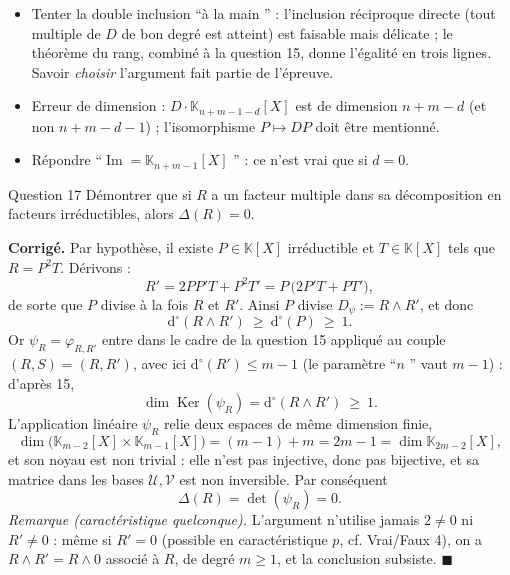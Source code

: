 \documentclass[11pt,a4paper]{article}
\newenvironment{corrige}
  {\par\medskip\noindent
   \begin{tcolorbox}[blanker, breakable,
     borderline west={2.5pt}{0pt}{vertP},
     left=10pt, top=2pt, bottom=2pt]
   {\color{vertP}\bfseries Corrigé.}\hspace{0.5em}\ignorespaces}
  {\hfill$\blacksquare$\end{tcolorbox}\medskip}
\newcommand{\og}{``}
\newcommand{\fg}{''}
\newcommand{\K}{\mathbb{K}}
\newcommand{\dg}[1]{\mathrm{d}^{\circ}\!\left(#1\right)}
\DeclareMathOperator{\Ker}{Ker}
\DeclareMathOperator{\Ima}{Im}
\begin{document}
\begin{pieges}
\begin{itemize}[leftmargin=1.4em, itemsep=2pt]
\item Tenter la double inclusion \og à la main \fg{} : l'inclusion
réciproque directe (tout multiple de $D$ de bon degré est atteint)
est faisable mais délicate ; le théorème du rang, combiné à la
question 15, donne l'égalité en trois lignes. Savoir \emph{choisir}
l'argument fait partie de l'épreuve.
\item Erreur de dimension : $D\cdot\K_{n+m-1-d}[X]$ est de dimension
$n+m-d$ (et non $n+m-d-1$) ; l'isomorphisme $P\mapsto DP$ doit être
mentionné.
\item Répondre \og $\Ima=\K_{n+m-1}[X]$ \fg{} : ce n'est vrai que si
$d=0$.
\end{itemize}
\end{pieges}

\begin{enonce}{Question 17}
Démontrer que si $R$ a un facteur multiple dans sa décomposition en
facteurs irréductibles, alors $\Delta(R)=0$.
\end{enonce}

\begin{corrige}
Par hypothèse, il existe $P\in\K[X]$ irréductible et $T\in\K[X]$
tels que $R=P^{2}T$. Dérivons :
\[
R'=2PP'T+P^{2}T'=P\,\big(2P'T+PT'\big),
\]
de sorte que $P$ divise à la fois $R$ et $R'$. Ainsi $P$ divise
$D_\psi:=R\wedge R'$, et donc
\[
\dg{R\wedge R'}\ \ge\ \dg{P}\ \ge\ 1 .
\]
Or $\psi_R=\varphi_{R,R'}$ entre dans le cadre de la question 15
appliqué au couple $(R,S)=(R,R')$, avec ici $\dg{R'}\le m-1$ (le
paramètre \og $n$ \fg{} vaut $m-1$) : d'après 15,
\[
\dim\Ker(\psi_R)=\dg{R\wedge R'}\ \ge\ 1 .
\]
L'application linéaire $\psi_R$ relie deux espaces de même dimension
finie,
\[
\dim\big(\K_{m-2}[X]\times\K_{m-1}[X]\big)=(m-1)+m=2m-1
=\dim\K_{2m-2}[X],
\]
et son noyau est non trivial : elle n'est pas injective, donc pas
bijective, et sa matrice dans les bases $\mathcal{U},\mathcal{V}$
est non inversible. Par conséquent
\[
\Delta(R)=\det(\psi_R)=0 .
\]
\emph{Remarque (caractéristique quelconque).} L'argument n'utilise
jamais $2\neq 0$ ni $R'\neq 0$ : même si $R'=0$ (possible en
caractéristique $p$, cf. Vrai/Faux 4), on a $R\wedge R'=R\wedge 0$
associé à $R$, de degré $m\ge 1$, et la conclusion subsiste.
\end{corrige}
\end{document}
